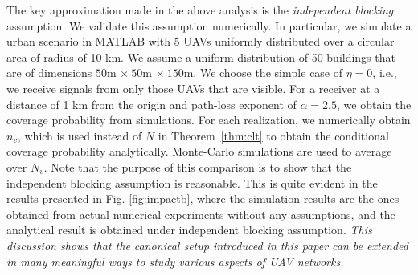 \documentclass[journal,draftclsnofoot,onecolumn,12pt]{IEEEtran}
\begin{document}

The key approximation made in the above analysis is the {\em independent blocking} assumption. We validate this assumption numerically. In particular, we simulate a urban scenario in MATLAB with 5 UAVs uniformly distributed over a circular area of radius of 10 km. We assume a uniform distribution of 50 buildings that are of dimensions $50$m $\times\ 50$m $\times\ 150$m. We choose the simple case of $\eta=0$, i.e., we receive signals from only those UAVs that are visible. For a receiver at a distance of 1 km from the origin and path-loss exponent of $\alpha = 2.5$, we obtain the coverage probability from simulations. For each realization, we numerically obtain $n_v$, which is used instead of $N$ in Theorem~\ref{thm:clt} to obtain the conditional coverage probability analytically. Monte-Carlo simulations are used to average over $N_v$. Note that the purpose of this comparison is to show that the independent blocking assumption is reasonable. This is quite evident in the results presented in Fig. \ref{fig:impactb}, where the simulation results are the ones obtained from actual numerical experiments without any assumptions, and the analytical result is obtained under independent blocking assumption. {\em This discussion shows that the canonical setup introduced in this paper can be extended in many meaningful ways to study various aspects of UAV networks.}
\end{document}

